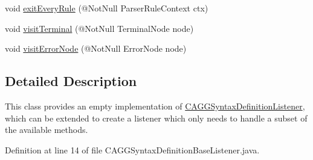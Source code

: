 \begin{DoxyCompactItemize}
\item 
void \hyperlink{classit_1_1emarolab_1_1cagg_1_1core_1_1language_1_1parser_1_1ANTLRInterface_1_1ANTLRGenerated_1_1a45b55289931e185944c10a916c8cdd_ada9d82b336dcbd7eae04023177d91498}{exit\-Every\-Rule} (@Not\-Null Parser\-Rule\-Context ctx)
\item 
void \hyperlink{classit_1_1emarolab_1_1cagg_1_1core_1_1language_1_1parser_1_1ANTLRInterface_1_1ANTLRGenerated_1_1a45b55289931e185944c10a916c8cdd_a436d6fe0ed4da71d95108865d44d830a}{visit\-Terminal} (@Not\-Null Terminal\-Node node)
\item 
void \hyperlink{classit_1_1emarolab_1_1cagg_1_1core_1_1language_1_1parser_1_1ANTLRInterface_1_1ANTLRGenerated_1_1a45b55289931e185944c10a916c8cdd_a5e8e7fe359e830d6ff579f8766cd38f7}{visit\-Error\-Node} (@Not\-Null Error\-Node node)
\end{DoxyCompactItemize}


\subsection{Detailed Description}
This class provides an empty implementation of \hyperlink{interfaceit_1_1emarolab_1_1cagg_1_1core_1_1language_1_1parser_1_1ANTLRInterface_1_1ANTLRGenerate8f089aac366bd2683be460c907cc6185}{C\-A\-G\-G\-Syntax\-Definition\-Listener}, which can be extended to create a listener which only needs to handle a subset of the available methods. 

Definition at line 14 of file C\-A\-G\-G\-Syntax\-Definition\-Base\-Listener.\-java.



